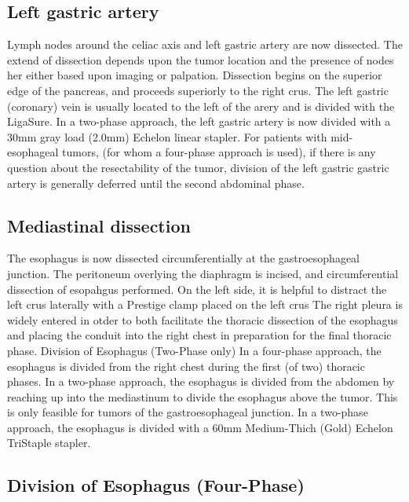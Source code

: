 \documentclass[
  letterpaper,
]{scrbook}
\begin{document}
\subsection{Left gastric artery}\label{left-gastric-artery}

Lymph nodes around the celiac axis and left gastric artery are now
dissected. The extend of dissection depends upon the tumor location and
the presence of nodes her either based upon imaging or palpation.
Dissection begins on the superior edge of the pancreas, and proceeds
superiorly to the right crus. The left gastric (coronary) vein is
usually located to the left of the arery and is divided with the
LigaSure. In a two-phase approach, the left gastric artery is now
divided with a 30mm gray load (2.0mm) Echelon linear stapler. For
patients with mid-esophageal tumors, (for whom a four-phase approach is
used), if there is any question about the resectability of the tumor,
division of the left gastric gastric artery is generally deferred until
the second abdominal phase.

\subsection{Mediastinal dissection}\label{mediastinal-dissection}

The esophagus is now dissected circumferentially at the gastroesophageal
junction. The peritoneum overlying the diaphragm is incised, and
circumferential dissection of esopahgus performed. On the left side, it
is helpful to distract the left crus laterally with a Prestige clamp
placed on the left crus The right pleura is widely entered in otder to
both facilitate the thoracic dissection of the esophagus and placing the
conduit into the right chest in preparation for the final thoracic
phase. Division of Esophagus (Two-Phase only) In a four-phase approach,
the esophagus is divided from the right chest during the first (of two)
thoracic phases. In a two-phase approach, the esophagus is divided from
the abdomen by reaching up into the mediastinum to divide the esophagus
above the tumor. This is only feasible for tumors of the
gastroesophageal junction. In a two-phase approach, the esophagus is
divided with a 60mm Medium-Thich (Gold) Echelon TriStaple stapler.

\subsection{Division of Esophagus
(Four-Phase)}\label{division-of-esophagus-four-phase}
\end{document}
